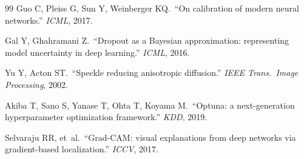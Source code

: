 \documentclass[11pt,twocolumn]{article}
\begin{document}
\begin{thebibliography}{99}
Guo C, Pleiss G, Sun Y, Weinberger KQ.\ ``On calibration of modern
neural networks.'' \emph{ICML}, 2017.

Gal Y, Ghahramani Z.\ ``Dropout as a Bayesian approximation:
representing model uncertainty in deep learning.'' \emph{ICML}, 2016.

Yu Y, Acton ST.\ ``Speckle reducing anisotropic diffusion.''
\emph{IEEE Trans.\ Image Processing}, 2002.

Akiba T, Sano S, Yanase T, Ohta T, Koyama M.\ ``Optuna: a
next-generation hyperparameter optimization framework.'' \emph{KDD},
2019.

Selvaraju RR, et~al.\ ``Grad-CAM: visual explanations from deep
networks via gradient-based localization.'' \emph{ICCV}, 2017.

\end{thebibliography}
\end{document}
